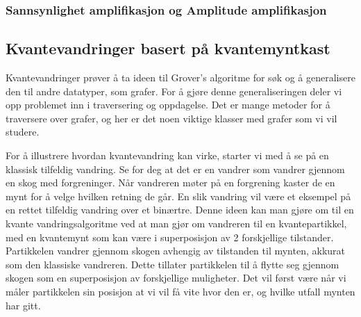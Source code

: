 
    \subsubsection*{Sannsynlighet amplifikasjon og Amplitude amplifikasjon}


        
\subsection{Kvantevandringer basert på kvantemyntkast}

    Kvantevandringer prøver å ta ideen til Grover's algoritme for søk og å generalisere den til andre datatyper, som grafer. For å gjøre denne generaliseringen deler vi opp problemet inn i traversering og oppdagelse. Det er mange metoder for å traversere over grafer, og her er det noen viktige klasser med grafer som vi vil studere.



    For å illustrere hvordan kvantevandring kan virke, starter vi med å se på en klassisk tilfeldig vandring. Se for deg at det er en vandrer som vandrer gjennom en skog med forgreninger. Når vandreren møter på en forgrening kaster de en mynt for å velge hvilken retning de går. En slik vandring vil være et eksempel på en rettet tilfeldig vandring over et binærtre. Denne ideen kan man gjøre om til en kvante vandringsalgoritme ved at man gjør om vandreren til en kvantepartikkel, med en kvantemynt som kan være i superposisjon av 2 forskjellige tilstander. Partikkelen vandrer gjennom skogen avhengig av tilstanden til mynten, akkurat som den klassiske vandreren. Dette tillater partikkelen til å flytte seg gjennom skogen som en superposisjon av forskjellige muligheter. Det vil først være når vi måler partikkelen sin posisjon at vi vil få vite hvor den er, og hvilke utfall mynten har gitt.

